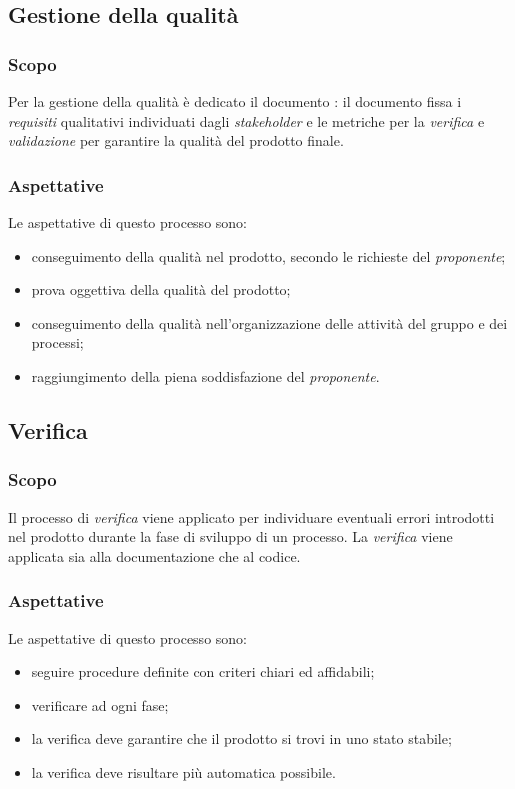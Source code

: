 		\subsection{Gestione della qualità}
			\subsubsection{Scopo}
				Per la gestione della qualità è dedicato il documento \PdQ{}: il documento fissa i \emph{requisiti} qualitativi individuati dagli \emph{stakeholder} e le metriche per la \emph{verifica} e \emph{validazione} per garantire la qualità del prodotto finale.
		
			\subsubsection{Aspettative}
				 Le aspettative di questo processo sono:
					\begin{itemize}
						\item conseguimento della qualità nel prodotto, secondo le richieste del \emph{proponente};
						\item prova oggettiva della qualità del prodotto;						
						\item conseguimento della qualità nell'organizzazione delle attività del gruppo e dei processi;
						\item raggiungimento della piena soddisfazione del \emph{proponente}.
					\end{itemize}
		
	
		\subsection{Verifica}
			\subsubsection{Scopo}
				Il processo di \emph{verifica} viene applicato per individuare eventuali errori introdotti nel prodotto durante la fase di sviluppo di un processo. La \emph{verifica} viene applicata sia alla documentazione che al codice. %
			\subsubsection{Aspettative}
				Le aspettative di questo processo sono:
					\begin{itemize}
						\item seguire procedure definite con criteri chiari ed affidabili;
						\item verificare ad ogni fase;
						\item la verifica deve garantire che il prodotto si trovi in uno stato stabile;
						\item la verifica deve risultare più automatica possibile.
					\end{itemize}
				
